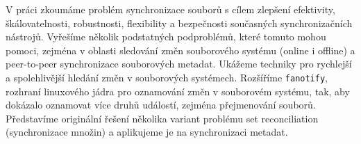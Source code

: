 \documentclass[12pt,a4paper]{report}
\begin{document}
V práci zkoumáme problém synchronizace souborů s cílem zlepšení efektivity,
škálovatelnosti, robustnosti, flexibility a bezpečnosti současných synchronizačních
nástrojů. Vyřešíme několik podstatných podproblémů, které tomuto mohou pomoci, zejména
v oblasti sledování změn souborového systému (online i offline) a peer-to-peer
synchronizace souborových metadat. Ukážeme techniky pro rychlejší a spolehlivější
hledání změn v souborových systémech. Rozšíříme \texttt{fanotify}, rozhraní linuxového
jádra pro oznamování změn v souborovém systému, tak, aby dokázalo oznamovat více druhů
událostí, zejména přejmenování souborů. Představíme originální řešení několika variant
problému set reconciliation (synchronizace množin) a aplikujeme je na synchronizaci
metadat.
\end{document}
